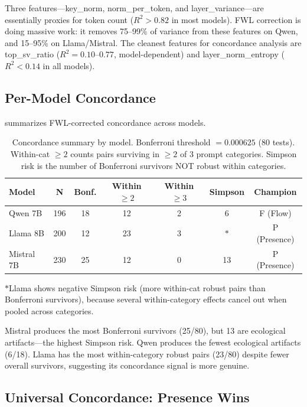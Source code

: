 \documentclass[11pt,a4paper]{article}
\begin{document}
Three features---key\_norm, norm\_per\_token, and layer\_variance---are essentially proxies for token count ($R^2 > 0.82$ in most models). FWL correction is doing massive work: it removes 75--99\% of variance from these features on Qwen, and 15--95\% on Llama/Mistral. The cleanest features for concordance analysis are top\_sv\_ratio ($R^2 = 0.10$--$0.77$, model-dependent) and layer\_norm\_entropy ($R^2 < 0.14$ in all models).

\subsection{Per-Model Concordance}

 summarizes FWL-corrected concordance across models.

\begin{table}[H]
\centering
\caption{Concordance summary by model. Bonferroni threshold $= 0.000625$ (80 tests). Within-cat $\geq 2$ counts pairs surviving in $\geq 2$ of 3 prompt categories. Simpson risk is the number of Bonferroni survivors NOT robust within categories.}
\label{tab:model_summary}
\begin{tabular}{lcccccc}
\toprule
\textbf{Model} & \textbf{N} & \textbf{Bonf.} & \textbf{Within $\geq 2$} & \textbf{Within $\geq 3$} & \textbf{Simpson} & \textbf{Champion} \\
\midrule
Qwen 7B    & 196 & 18 & 12 & 2 & 6  & F (Flow) \\
Llama 8B   & 200 & 12 & 23 & 3 & $*$ & P (Presence) \\
Mistral 7B & 230 & 25 & 12 & 0 & 13 & P (Presence) \\
\bottomrule
\end{tabular}

\raggedright\small $*$Llama shows negative Simpson risk (more within-cat robust pairs than Bonferroni survivors), because several within-category effects cancel out when pooled across categories.
\end{table}

Mistral produces the most Bonferroni survivors (25/80), but 13 are ecological artifacts---the highest Simpson risk. Qwen produces the fewest ecological artifacts (6/18). Llama has the most within-category robust pairs (23/80) despite fewer overall survivors, suggesting its concordance signal is more genuine.

\subsection{Universal Concordance: Presence Wins}
\label{sec:universal}
\end{document}
